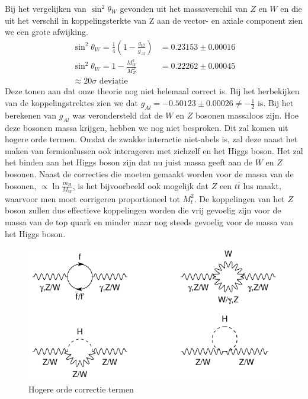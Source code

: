 \documentclass[../main.tex]{subfiles}
\begin{document}
Bij het vergelijken van $\sin^2\theta_W$ gevonden uit het massaverschil van $Z$ en $W$ en die uit het verschil in koppelingsterkte van Z aan de vector- en axiale component zien we een grote afwijking.
\begin{equation}
    \begin{aligned}
        \label{eq:vergelijken_weignberg_res}
        \sin^2\theta_W = \frac{1}{4}  \left( 1 - \frac{g_{Vl}}{g_{Al}} \right) &= 0.23153 \pm 0.00016\\
        \sin^2\theta_W = 1 - \frac{M_W^2}{M_Z^2} &= 0.22262 \pm 0.00045\\
        \approx 20\sigma \text{ deviatie}
    \end{aligned}
\end{equation}
Deze tonen aan dat onze theorie nog niet helemaal correct is. Bij het herbekijken van de koppelingstrektes zien we dat $g_{Al} = -0.50123 \pm 0.00026 \neq -\frac{1}{2}$ is. Bij het berekenen van $g_{Al}$ was verondersteld dat de $W$ en $Z$ bosonen massaloos zijn. Hoe deze bosonen massa krijgen, hebben we nog niet besproken. Dit zal komen uit hogere orde termen. Omdat de zwakke interactie niet-abels is, zal deze naast het maken van fermionlussen ook interageren met zichzelf en het Higgs boson. Het zal het binden aan het Higgs boson zijn dat nu juist massa geeft aan de $W$ en $Z$ bosonen. Naast de correcties die moeten gemaakt worden voor de massa van de bosonen, $\propto \ln \frac{m_H}{M_W}$, is het bijvoorbeeld ook mogelijk dat $Z$ een $t\overline t$ lus maakt, waarvoor men moet corrigeren proportioneel tot $M_t^2$. De koppelingen van het $Z$ boson zullen dus effectieve koppelingen worden die vrij gevoelig zijn voor de massa van de top quark en minder maar nog steeds gevoelig voor de massa van het Higgs boson.

\begin{figure}[h]
    \centering
    \includegraphics[width=0.6\linewidth]{elektroweak_precision_tests/hogere_orde_w.png}
    \caption{Hogere orde correctie termen}%
    \label{fig:elektroweak_precision_tests/hogere_orde_w}
\end{figure}
\end{document}
